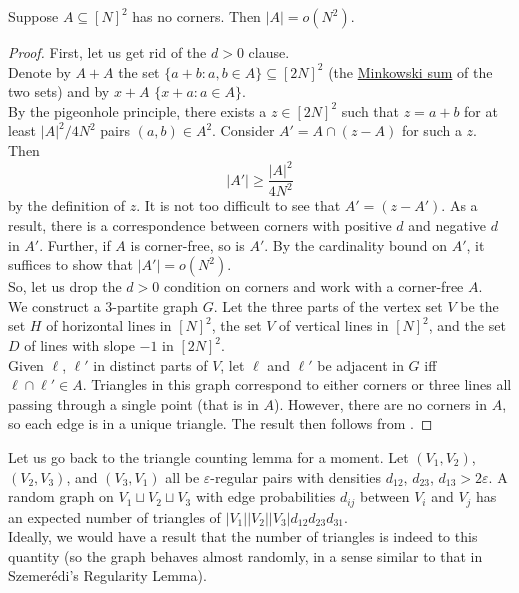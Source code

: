 			\begin{ftheo}
				\label{no corners theorem}
				Suppose $A\subseteq[N]^2$ has no corners. Then $|A| = o(N^2)$.
			\end{ftheo}
			\begin{proof}
				First, let us get rid of the $d>0$ clause.\\
				Denote by $A+A$ the set $\{a+b : a,b\in A\} \subseteq [2N]^2$ (the \href{https://en.wikipedia.org/wiki/Minkowski_addition}{Minkowski sum} of the two sets) and by $x+A$ $\{x+a : a\in A\}$.\\
				By the pigeonhole principle, there exists a $z\in[2N]^2$ such that $z=a+b$ for at least $|A|^2/4N^2$ pairs $(a,b)\in A^2$. Consider $A' = A \cap (z-A)$ for such a $z$. Then
				\[ |A'| \ge \frac{|A|^2}{4N^2} \]
				by the definition of $z$. It is not too difficult to see that $A' = (z - A')$. As a result, there is a correspondence between corners with positive $d$ and negative $d$ in $A'$. Further, if $A$ is corner-free, so is $A'$. By the cardinality bound on $A'$, it suffices to show that $|A'|=o(N^2)$.\\
				So, let us drop the $d > 0$ condition on corners and work with a corner-free $A$.\\

				We construct a $3$-partite graph $G$. Let the three parts of the vertex set $V$ be the set $H$ of horizontal lines in $[N]^2$, the set $V$ of vertical lines in $[N]^2$, and the set $D$ of lines with slope $-1$ in $[2N]^2$.\\
				Given $\ell$, $\ell'$ in distinct parts of $V$, let $\ell$ and $\ell'$ be adjacent in $G$ iff $\ell\cap\ell'\in A$. Triangles in this graph correspond to either corners or three lines all passing through a single point (that is in $A$). However, there are no corners in $A$, so each edge is in a unique triangle. The result then follows from .
			\end{proof}

			Let us go back to the triangle counting lemma for a moment. Let $(V_1,V_2)$, $(V_2,V_3)$, and $(V_3,V_1)$ all be $\varepsilon$-regular pairs with densities $d_{12}$, $d_{23}$, $d_{13}>2\varepsilon$. A random graph on $V_1\sqcup V_2\sqcup V_3$ with edge probabilities $d_{ij}$ between $V_i$ and $V_j$ has an expected number of triangles of $|V_1||V_2||V_3| d_{12}d_{23}d_{31}$.\\
			Ideally, we would have a result that the number of triangles is indeed to this quantity (so the graph behaves almost randomly, in a sense similar to that in Szemer\'{e}di's Regularity Lemma).\clearpage

